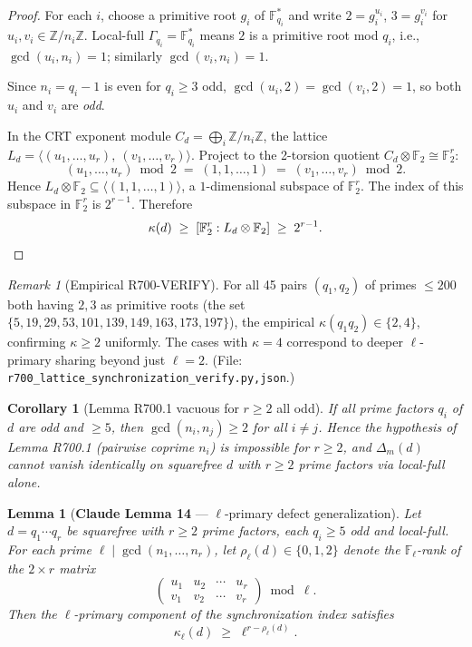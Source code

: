 \documentclass[12pt]{amsart}
\newtheorem{lemma}{Lemma}
\newtheorem{corollary}{Corollary}
\theoremstyle{definition}
\theoremstyle{remark}
\newtheorem{remark}{Remark}
\begin{document}
\begin{proof}
For each $i$, choose a primitive root $g_i$ of $\mathbb{F}_{q_i}^*$ and write
$2 = g_i^{u_i}$, $3 = g_i^{v_i}$ for $u_i, v_i \in \mathbb{Z}/n_i\mathbb{Z}$. Local-full $\Gamma_{q_i} = \mathbb{F}_{q_i}^*$ means $2$ is a primitive root mod $q_i$, i.e., $\gcd(u_i, n_i) = 1$; similarly $\gcd(v_i, n_i) = 1$.

Since $n_i = q_i - 1$ is even for $q_i \ge 3$ odd, $\gcd(u_i, 2) = \gcd(v_i, 2) = 1$, so both $u_i$ and $v_i$ are \emph{odd}.

In the CRT exponent module $C_d = \bigoplus_i \mathbb{Z}/n_i\mathbb{Z}$, the lattice $L_d = \langle (u_1, \ldots, u_r),\ (v_1, \ldots, v_r) \rangle$. Project to the 2-torsion quotient $C_d \otimes \mathbb{F}_2 \cong \mathbb{F}_2^r$:
$$
(u_1, \ldots, u_r) \bmod 2 \;=\; (1, 1, \ldots, 1) \;=\; (v_1, \ldots, v_r) \bmod 2.
$$
Hence $L_d \otimes \mathbb{F}_2 \subseteq \langle (1, 1, \ldots, 1) \rangle$, a $1$-dimensional subspace of $\mathbb{F}_2^r$. The index of this subspace in $\mathbb{F}_2^r$ is $2^{r-1}$. Therefore
$$
\kappa(d) \;\ge\; [\mathbb{F}_2^r : L_d \otimes \mathbb{F}_2] \;\ge\; 2^{r-1}. \qedhere
$$
\end{proof}

\begin{remark}[Empirical R700-VERIFY]
For all 45 pairs $(q_1, q_2)$ of primes $\le 200$ both having $2, 3$ as primitive roots (the set $\{5, 19, 29, 53, 101, 139, 149, 163, 173, 197\}$), the empirical $\kappa(q_1 q_2) \in \{2, 4\}$, confirming $\kappa \ge 2$ uniformly. The cases with $\kappa = 4$ correspond to deeper $\ell$-primary sharing beyond just $\ell = 2$. \hfill(File: \texttt{r700\_lattice\_synchronization\_verify.{py,json}}.)
\end{remark}

\begin{corollary}[Lemma R700.1 vacuous for $r \ge 2$ all odd]
If all prime factors $q_i$ of $d$ are odd and $\ge 5$, then $\gcd(n_i, n_j) \ge 2$ for all $i \ne j$. Hence the hypothesis of Lemma R700.1 (pairwise coprime $n_i$) is impossible for $r \ge 2$, and $\Delta_m(d)$ \emph{cannot} vanish identically on squarefree $d$ with $r \ge 2$ prime factors via local-full alone.
\end{corollary}

\begin{lemma}[\textbf{Claude Lemma 14} --- $\ell$-primary defect generalization]\label{lem:Claude-ell-primary}
Let $d = q_1 \cdots q_r$ be squarefree with $r \ge 2$ prime factors, each $q_i \ge 5$ odd and local-full. For each prime $\ell \mid \gcd(n_1, \ldots, n_r)$, let $\rho_\ell(d) \in \{0, 1, 2\}$ denote the $\mathbb{F}_\ell$-rank of the $2 \times r$ matrix
$$
\begin{pmatrix} u_1 & u_2 & \cdots & u_r \\ v_1 & v_2 & \cdots & v_r \end{pmatrix} \bmod \ell.
$$
Then the $\ell$-primary component of the synchronization index satisfies
$$
\kappa_\ell(d) \;\ge\; \ell^{r - \rho_\ell(d)}.
$$
\end{lemma}
\end{document}
